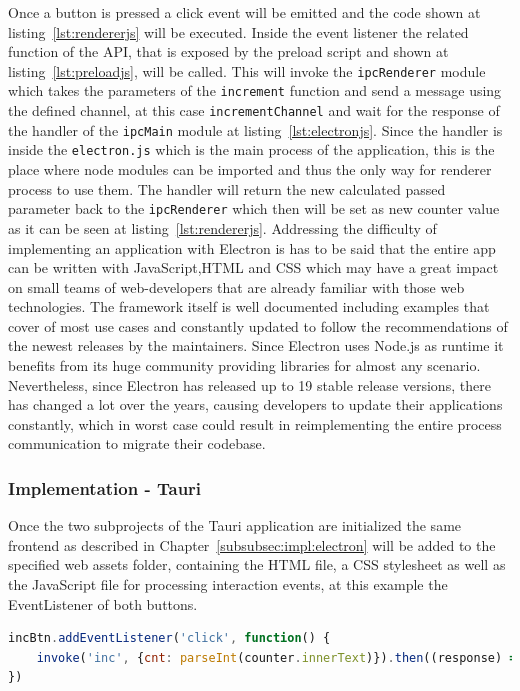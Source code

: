 Once a button is pressed a click event will be emitted and the code shown at listing~\ref{lst:rendererjs} will be executed.
Inside the event listener the related function of the \ac{API}, that is exposed by the preload script and shown at listing~\ref{lst:preloadjs}, will be called.
This will invoke the \texttt{ipcRenderer} module which takes the parameters of the \texttt{increment} function and send a message using the defined channel, at this case \texttt{incrementChannel} and wait for the response of the handler of the
\texttt{ipcMain} module at listing~\ref{lst:electronjs}.
Since the handler is inside the \texttt{electron.js} which is the main process of the application, this is the place where node modules can be imported and thus the only way for renderer process to use them.
The handler will return the new calculated passed parameter back to the \texttt{ipcRenderer} which then will be set as new counter value as it can be seen at listing~\ref{lst:rendererjs}.
Addressing the difficulty of implementing an application with Electron is has to be said that the entire app can be written with JavaScript,\ac{HTML} and \ac{CSS} which may have a great impact
on small teams of web-developers that are already familiar with those web technologies.
The framework itself is well documented including examples that cover of most use cases and constantly updated to follow the recommendations of the newest releases by the maintainers.
Since Electron uses Node.js as runtime it benefits from its huge community providing libraries for almost any scenario.
Nevertheless, since Electron has released up to 19 stable release versions, there has changed a lot over the years, causing developers to update their applications constantly, which in worst case could result
in reimplementing the entire process communication to migrate their codebase.
\subsubsection{Implementation - Tauri}
Once the two subprojects of the Tauri application are initialized the same frontend as described in Chapter~\ref{subsubsec:impl:electron} will be added to the specified web assets folder,
containing the \ac{HTML} file, a \ac{CSS} stylesheet as well as the JavaScript file for processing interaction events, at this example the EventListener of both buttons.

\begin{lstlisting}[language=JavaScript,label={lst:indexjsTauri}, caption={Excerpt of index.js}]
incBtn.addEventListener('click', function() {
    invoke('inc', {cnt: parseInt(counter.innerText)}).then((response) => counter.innerText=response)
})
\end{lstlisting}

